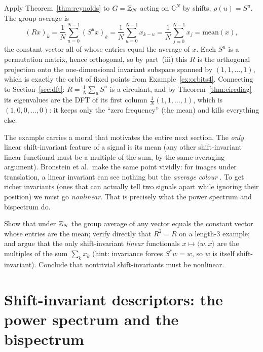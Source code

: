 \begin{example}
\label{ex:shiftavg}
Apply Theorem~\ref{thm:reynolds} to $G = \mathbb{Z}_N$ acting on $\mathbb{C}^N$ by shifts,
$\rho(u) = S^u$. The group average is
\[
  (R x)_k = \frac{1}{N}\sum_{u=0}^{N-1} (S^u x)_k
          = \frac{1}{N}\sum_{u=0}^{N-1} x_{k-u}
          = \frac{1}{N}\sum_{j=0}^{N-1} x_j
          = \text{mean}(x),
\]
the constant vector all of whose entries equal the average of $x$. Each $S^u$ is a
permutation matrix, hence orthogonal, so by part~(iii) this $R$ is the orthogonal
projection onto the one-dimensional invariant subspace spanned by $(1,1,\dots,1)$,
which is exactly the orbit of fixed points from Example~\ref{ex:orbits4}. Connecting to
Section~\ref{sec:dft}: $R = \tfrac1N\sum_u S^u$ is a circulant, and by
Theorem~\ref{thm:circdiag} its eigenvalues are the DFT of its first column
$\tfrac1N(1,1,\dots,1)$, which is $(1,0,0,\dots,0)$: it keeps only the ``zero
frequency'' (the mean) and kills everything else.
\end{example}

The example carries a moral that motivates the entire next section. The \emph{only}
linear shift-invariant feature of a signal is its mean (any other shift-invariant linear
functional must be a multiple of the sum, by the same averaging argument). Bronstein et
al.\ make the same point vividly: for images under translation, a linear invariant can
see nothing but the \emph{average colour} \citep{groups_bronstein}. To get richer
invariants (ones that can actually tell two signals apart while ignoring their
position) we must go \emph{nonlinear}. That is precisely what the power spectrum and
bispectrum do.

\begin{problem}
\label{prob:reynolds}
Show that under $\mathbb{Z}_N$ the group average of any vector equals the constant vector whose
entries are the mean; verify directly that $R^2 = R$ on a length-$3$ example; and argue
that the only shift-invariant \emph{linear} functionals $x \mapsto \langle w, x\rangle$
are the multiples of the sum $\sum_k x_k$ (hint: invariance forces $S^\ast w = w$, so
$w$ is itself shift-invariant). Conclude that nontrivial shift-invariants must be
nonlinear.
\end{problem}


\section{Shift-invariant descriptors: the power spectrum and the bispectrum}
\label{sec:invariants}

